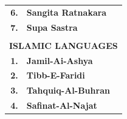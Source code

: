 \documentclass[11pt, openany]{book}
\begin{document}
\begin{table}[h!]
\begin{tabular}{rl}
 \textbf{\small 6.}& \textbf{\small Sangita Ratnakara}\\
 \textbf{\small 7.}& \textbf{\small Supa Sastra}\\
 &\\
 \multicolumn{2}{c}{\textbf{ ISLAMIC LANGUAGES}}\\
 \textbf{\small 1.}& \textbf{\small Jamil-Ai-Ashya}\\
 \textbf{\small 2.}& \textbf{\small Tibb-E-Faridi}\\
 \textbf{\small 3.}& \textbf{\small Tahquiq-Al-Buhran}\\
 \textbf{\small 4.}& \textbf{\small Safinat-Al-Najat}\\
\end{tabular}
\end{table}

\newpage
\thispagestyle{empty}
\begin{center}
{}
\end{center}
\end{document}
